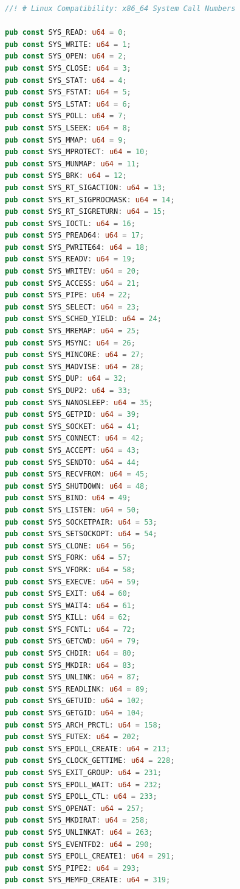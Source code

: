 \begin{lstlisting}[language=Rust, caption={Linux x86\_64 System Call Constants (\texttt{src/compat/linux/syscalls.rs})}]
//! # Linux Compatibility: x86_64 System Call Numbers

pub const SYS_READ: u64 = 0;
pub const SYS_WRITE: u64 = 1;
pub const SYS_OPEN: u64 = 2;
pub const SYS_CLOSE: u64 = 3;
pub const SYS_STAT: u64 = 4;
pub const SYS_FSTAT: u64 = 5;
pub const SYS_LSTAT: u64 = 6;
pub const SYS_POLL: u64 = 7;
pub const SYS_LSEEK: u64 = 8;
pub const SYS_MMAP: u64 = 9;
pub const SYS_MPROTECT: u64 = 10;
pub const SYS_MUNMAP: u64 = 11;
pub const SYS_BRK: u64 = 12;
pub const SYS_RT_SIGACTION: u64 = 13;
pub const SYS_RT_SIGPROCMASK: u64 = 14;
pub const SYS_RT_SIGRETURN: u64 = 15;
pub const SYS_IOCTL: u64 = 16;
pub const SYS_PREAD64: u64 = 17;
pub const SYS_PWRITE64: u64 = 18;
pub const SYS_READV: u64 = 19;
pub const SYS_WRITEV: u64 = 20;
pub const SYS_ACCESS: u64 = 21;
pub const SYS_PIPE: u64 = 22;
pub const SYS_SELECT: u64 = 23;
pub const SYS_SCHED_YIELD: u64 = 24;
pub const SYS_MREMAP: u64 = 25;
pub const SYS_MSYNC: u64 = 26;
pub const SYS_MINCORE: u64 = 27;
pub const SYS_MADVISE: u64 = 28;
pub const SYS_DUP: u64 = 32;
pub const SYS_DUP2: u64 = 33;
pub const SYS_NANOSLEEP: u64 = 35;
pub const SYS_GETPID: u64 = 39;
pub const SYS_SOCKET: u64 = 41;
pub const SYS_CONNECT: u64 = 42;
pub const SYS_ACCEPT: u64 = 43;
pub const SYS_SENDTO: u64 = 44;
pub const SYS_RECVFROM: u64 = 45;
pub const SYS_SHUTDOWN: u64 = 48;
pub const SYS_BIND: u64 = 49;
pub const SYS_LISTEN: u64 = 50;
pub const SYS_SOCKETPAIR: u64 = 53;
pub const SYS_SETSOCKOPT: u64 = 54;
pub const SYS_CLONE: u64 = 56;
pub const SYS_FORK: u64 = 57;
pub const SYS_VFORK: u64 = 58;
pub const SYS_EXECVE: u64 = 59;
pub const SYS_EXIT: u64 = 60;
pub const SYS_WAIT4: u64 = 61;
pub const SYS_KILL: u64 = 62;
pub const SYS_FCNTL: u64 = 72;
pub const SYS_GETCWD: u64 = 79;
pub const SYS_CHDIR: u64 = 80;
pub const SYS_MKDIR: u64 = 83;
pub const SYS_UNLINK: u64 = 87;
pub const SYS_READLINK: u64 = 89;
pub const SYS_GETUID: u64 = 102;
pub const SYS_GETGID: u64 = 104;
pub const SYS_ARCH_PRCTL: u64 = 158;
pub const SYS_FUTEX: u64 = 202;
pub const SYS_EPOLL_CREATE: u64 = 213;
pub const SYS_CLOCK_GETTIME: u64 = 228;
pub const SYS_EXIT_GROUP: u64 = 231;
pub const SYS_EPOLL_WAIT: u64 = 232;
pub const SYS_EPOLL_CTL: u64 = 233;
pub const SYS_OPENAT: u64 = 257;
pub const SYS_MKDIRAT: u64 = 258;
pub const SYS_UNLINKAT: u64 = 263;
pub const SYS_EVENTFD2: u64 = 290;
pub const SYS_EPOLL_CREATE1: u64 = 291;
pub const SYS_PIPE2: u64 = 293;
pub const SYS_MEMFD_CREATE: u64 = 319;
\end{lstlisting}

